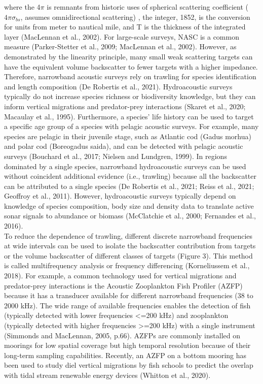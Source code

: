 where the 4$\pi$ is remnants from historic uses of spherical scattering coefficient ($4\pi\sigma_{bs}$, assumes omnidirectional scattering) , the integer, 1852, is the conversion for units from meter to nautical mile, and T is the thickness of the integrated layer (MacLennan et al., 2002). For large-scale surveys, NASC is a common measure (Parker-Stetter et al., 2009; MacLennan et al., 2002). However, as demonstrated by the linearity principle, many small weak scattering targets can have the equivalent volume backscatter to fewer targets with a higher impedance. Therefore, narrowband acoustic surveys rely on trawling for species identification and length composition (De Robertis et al., 2021). Hydroacoustic surveys typically do not increase species richness or biodiversity knowledge, but they can inform vertical migrations and predator-prey interactions (Skaret et al., 2020; Macaulay et al., 1995). Furthermore, a species' life history can be used to target a specific age group of a species with pelagic acoustic surveys. For example, many species are pelagic in their juvenile stage, such as Atlantic cod (Gadus morhua) and polar cod (Boreogadus saida), and can be detected with pelagic acoustic surveys (Bouchard et al., 2017; Nielsen and Lundgren, 1999). In regions dominated by a single species, narrowband hydroacoustic surveys can be used without coincident additional evidence (i.e., trawling) because all the backscatter can be attributed to a single species (De Robertis et al., 2021; Reiss et al., 2021; Geoffroy et al., 2011). However, hydroacoustic surveys typically depend on knowledge of species composition, body size and density data to translate active sonar signals to abundance or biomass (McClatchie et al., 2000; Fernandes et al., 2016).\\
To reduce the dependence of trawling, different discrete narrowband frequencies at wide intervals can be used to isolate the backscatter contribution from targets or the volume backscatter of different classes of targets (Figure 3). This method is called multifrequency analysis or frequency differencing (Korneliussem et al., 2018). For example, a common technology used for vertical migrations and predator-prey interactions is the Acoustic Zooplankton Fish Profiler (AZFP) because it has a transducer available for different narrowband frequencies (38 to 2000 kHz). The wide range of available frequencies enables the detection of fish (typically detected with lower frequencies <=200 kHz) and zooplankton (typically detected with higher frequencies >=200 kHz) with a single instrument (Simmonds and MacLennan, 2005, p.66). AZFPs are commonly installed on moorings for low spatial coverage but high temporal resolution because of their long-term sampling capabilities. Recently, an AZFP on a bottom mooring has been used to study diel vertical migrations by fish schools to predict the overlap with tidal stream renewable energy devices (Whitton et al., 2020). \\
 

